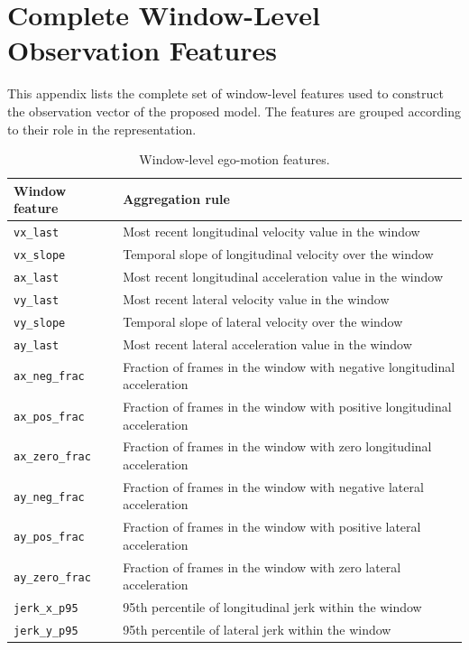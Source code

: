 \chapter{Complete Window-Level Observation Features}
\label{appendix:window_features}

This appendix lists the complete set of window-level features used to construct the observation vector of the proposed model. 
The features are grouped according to their role in the representation. 

\begin{table}[H]
    \centering
    \footnotesize
    \caption{Window-level ego-motion features.}
    \label{tab:appendix_ego_features}
    \begin{tabularx}{\textwidth}{@{}p{4.2cm}X@{}}
        \toprule
        \textbf{Window feature} & \textbf{Aggregation rule} \\
        \midrule
        \texttt{vx\_last} & Most recent longitudinal velocity value in the window \\
        \texttt{vx\_slope} & Temporal slope of longitudinal velocity over the window \\
        \texttt{ax\_last} & Most recent longitudinal acceleration value in the window \\
        \texttt{vy\_last} & Most recent lateral velocity value in the window \\
        \texttt{vy\_slope} & Temporal slope of lateral velocity over the window \\
        \texttt{ay\_last} & Most recent lateral acceleration value in the window \\
        \texttt{ax\_neg\_frac} & Fraction of frames in the window with negative longitudinal acceleration \\
        \texttt{ax\_pos\_frac} & Fraction of frames in the window with positive longitudinal acceleration \\
        \texttt{ax\_zero\_frac} & Fraction of frames in the window with zero longitudinal acceleration \\
        \texttt{ay\_neg\_frac} & Fraction of frames in the window with negative lateral acceleration \\
        \texttt{ay\_pos\_frac} & Fraction of frames in the window with positive lateral acceleration \\
        \texttt{ay\_zero\_frac} & Fraction of frames in the window with zero lateral acceleration \\
        \texttt{jerk\_x\_p95} & 95th percentile of longitudinal jerk within the window \\
        \texttt{jerk\_y\_p95} & 95th percentile of lateral jerk within the window \\
        \bottomrule
    \end{tabularx}
\end{table}


